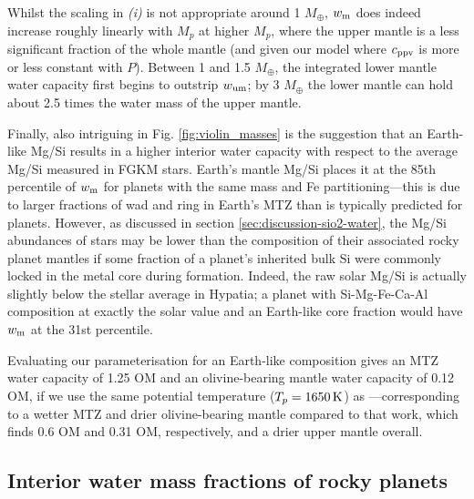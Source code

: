 Whilst the scaling in \textit{(i)} is not appropriate around 1 $M_\oplus$, $w_{\rm m}$ does indeed increase roughly linearly with $M_p$ at higher $M_p$, where the upper mantle is a less significant fraction of the whole mantle (and given our model where $c_{\rm ppv}$ is more or less constant with $P$). Between 1 and 1.5 $M_\oplus$, the integrated lower mantle water capacity first begins to outstrip $w_{\rm um}$; by 3 $M_\oplus$ the lower mantle can hold about 2.5 times the water mass of the upper mantle. 


Finally, also intriguing in Fig. \ref{fig:violin_masses} is the suggestion that an Earth-like Mg/Si results in a higher interior water capacity with respect to the average Mg/Si measured in FGKM stars. Earth's mantle Mg/Si places it at the 85th percentile of $w_{\rm m}$ for planets with the same mass and Fe partitioning---this is due to larger fractions of wad and ring in Earth's MTZ than is typically predicted for planets. However, as discussed in section \ref{sec:discussion-sio2-water}, the Mg/Si abundances of stars may be lower than the composition of their associated rocky planet mantles if some fraction of a planet's inherited bulk Si were commonly locked in the metal core during formation. Indeed, the raw solar Mg/Si is actually slightly below the stellar average in Hypatia; a planet with Si-Mg-Fe-Ca-Al composition at exactly the solar value and an Earth-like core fraction would have $w_{\rm m}$ at the 31st percentile.




Evaluating our parameterisation for an Earth-like composition gives an MTZ water capacity of 1.25 OM and an olivine-bearing mantle water capacity of 0.12 OM, if we use the same potential temperature ($T_p = 1650\,{\rm K}$) as \citet{andrault_mantle_2022}---corresponding to a wetter MTZ and drier olivine-bearing mantle compared to that work, which finds 0.6 OM and 0.31 OM, respectively, and a drier upper mantle overall.



\subsection{Interior water mass fractions of rocky planets}




